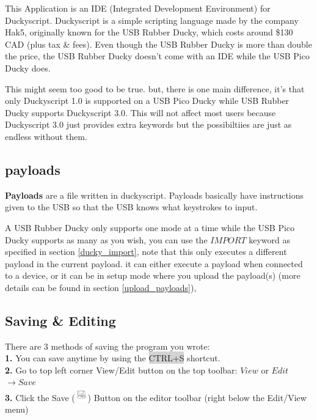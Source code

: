 \documentclass[a4paper,12pt]{article}
\begin{document}
This Application is an IDE (Integrated Development Environment) for Duckyscript. Duckyscript is a simple scripting language made by the company Hak5, originally known for the USB Rubber Ducky, which costs around \$130 CAD (plus tax \& fees).
Even though the USB Rubber Ducky is more than double the price, the USB Rubber Ducky doesn't come with an IDE while the USB Pico Ducky does.

This might seem too good to be true. but, there is one main difference,
it's that only Duckyscript 1.0 is supported on a USB Pico Ducky while USB Rubber Ducky supports Duckyscript 3.0. This will not affect most users because Duckyscript 3.0 just provides extra keywords but the possibiltiies are just as endless without them.

\subsection{payloads}

\textbf{Payloads} are a file written in duckyscript. Payloads basically have instructions given to the USB so that the USB knows what keystrokes to input.

A USB Rubber Ducky only supports one mode at a time while the USB Pico Ducky supports as many as you wish, you can use the $IMPORT$ keyword as specified in section \ref{ducky_import}, note that this only executes a different payload in the current payload. it can either execute a payload when connected to a device, or it can be in setup mode where you upload the payload(s) (more details can be found in section \ref{upload_payloads}), 

\subsection{Saving \& Editing}\label{save_edit}

There are 3 methods of saving the program you wrote:
\\\textbf{1.} You can save anytime by using the \colorbox{lightgray}{CTRL+S} shortcut. 
\\\textbf{2.} Go to top left corner View/Edit button on the top toolbar: $View$ or $Edit$ $\rightarrow Save$
\\\textbf{3.} Click the Save (\includegraphics[width=5.5mm]{pictures/black_bk/save.png}) Button on the editor toolbar (right below the Edit/View menu)
\end{document}
